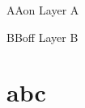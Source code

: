 \documentclass{article}
\begin{document}
%

\begin{ocg}{A}{A}{on}
Layer A \theHello
\end{ocg}

\begin{ocg}{B}{B}{off}
Layer B \theHello
\end{ocg}
\section{abc}

\theHello


%
\end{document}
